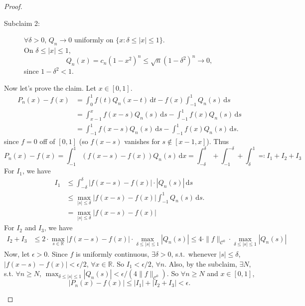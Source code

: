\documentclass[12pt]{article}
\theoremstyle{plain}
\theoremstyle{definition}
\begin{document}
\begin{proof}
\begin{description}
\begin{description}
                \item[Subclaim 2:] $\forall \delta>0$, $Q_n\rightarrow0$
                uniformly on $\{x:\delta\leq|x|\leq 1\}$.\\
                On $\delta\leq|x|\leq 1$,
                $$Q_n(x)=c_n(1-x^2)^n\leq \sqrt{n}(1-\delta^2)^n\rightarrow0,$$
                since $1-\delta^2<1$.
            \end{description}
        Now let's prove the claim.
        Let $x\in[0,1]$.
        $$\begin{aligned}
            P_n(x)-f(x)
            &=\int_0^1f(t)Q_n(x-t)\,\mathrm{d}t-f(x)\int_{-1}^1Q_n(s)\,\mathrm{d}s\\
            &=\int_{x-1}^xf(x-s)Q_n(s)\,\mathrm{d}s-\int_{-1}^1f(x)Q_n(s)\,\mathrm{d}s\\
            &=\int_{-1}^1f(x-s)Q_n(s)\,\mathrm{d}s-\int_{-1}^1f(x)Q_n(s)\,\mathrm{d}s.
        \end{aligned}$$
        since $f=0$ off of $[0,1]$ (so $f(x-s)$ vanishes for $s\notin[x-1,x]$).
        Thus
        $$
            P_n(x)-f(x)
            =\int_{-1}^1(f(x-s)-f(x))Q_n(s)\,\mathrm{d}x
            =\int_{-\delta}^\delta+
            \int_{-1}^{-\delta}+
            \int_{\delta}^1 \eqqcolon I_1+I_2+I_3
        $$
        For $I_1$, we have
        $$\begin{aligned}
            I_1&\leq
            \int_{-\delta}^\delta|f(x-s)-f(x)|\cdot|Q_n(s)|\,\mathrm{d}s\\
            &\leq\max_{|s|\leq\delta}|f(x-s)-f(x)|\int_{-1}^1Q_n(s)\,\mathrm{d}s.\\
            &=\max_{|s|\leq\delta}|f(x-s)-f(x)|
        \end{aligned}$$
        For $I_2$ and $I_3$, we have
        $$\begin{aligned}
            I_2+I_3
            &\leq2\cdot\max_{s\in\mathbb{R}}|f(x-s)-f(x)|\cdot \max_{\delta\leq
            |s|\leq1}|Q_n(s)|
            \leq 4\cdot \|f\|_{\mathcal{C}^0}\cdot \max_{\delta\leq|s|\leq1}|Q_n(s)|
        \end{aligned}$$
        Now, let $\epsilon>0$.
        Since $f$ is uniformly continuous,
        $\exists \delta>0$, s.t.\ 
        whenever $|s|\leq\delta$, $|f(x-s)-f(x)|<\epsilon/2$, $\forall
        x\in\mathbb{R}$.
        So $I_1<\epsilon/2$, $\forall n$.
        Also, by the subclaim, $\exists N$, s.t. $\forall n\geq N$,
        $\max_{\delta\leq|s|\leq1} |Q_n(s)|<\epsilon/(4\|f\|_{\mathcal{C}^0})$.
        So $\forall n\geq N$ and $x\in[0,1]$, 
        $$|P_n(x)-f(x)|\leq|I_1|+|I_2+I_3|<\epsilon.$$
    \end{description}
\end{proof}
\end{document}
